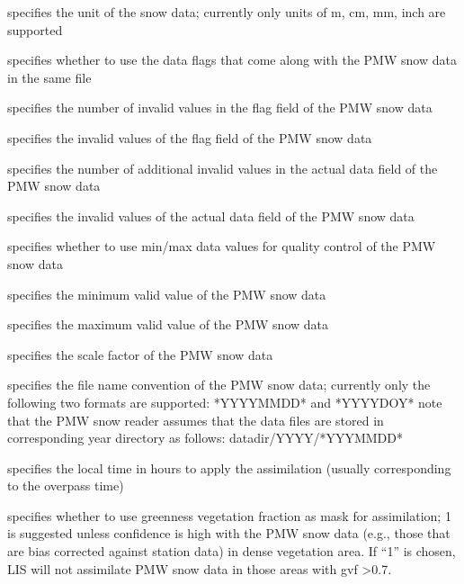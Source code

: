   specifies the unit of
 the snow data; currently only units of m, cm, mm, inch are supported

  specifies whether to use
 the data flags that come along with the PMW snow data in the same file

  specifies
 the number of invalid values in the flag field of the PMW snow data

  specifies the invalid values
 of the flag field of the PMW snow data

  specifies
 the number of additional invalid values in the actual data field of 
 the PMW snow data

  specifies the invalid
 values of the actual data field of the PMW snow data

  specifies whether to use
 min/max data values for quality control of the PMW snow data

  specifies the minimum valid 
 value of the PMW snow data

  specifies the maximum valid 
 value of the PMW snow data

  specifies the scale factor of
 the PMW snow data

  specifies the file name
 convention of the PMW snow data; currently only the following two
 formats are supported:
 *YYYYMMDD*  and *YYYYDOY*
 note that the PMW snow reader assumes that the data files are stored
 in corresponding year directory as follows: datadir/YYYY/*YYYMMDD*

  specifies the local time
 in hours to apply the assimilation (usually corresponding to the overpass time)

  specifies 
 whether to use greenness vegetation fraction as mask for assimilation;
 1 is suggested unless confidence is high with the PMW snow data (e.g.,
 those that are bias corrected against station data) in dense vegetation
 area.  If ``1'' is chosen, LIS will not assimilate PMW snow data in
 those areas with gvf \textgreater 0.7.

